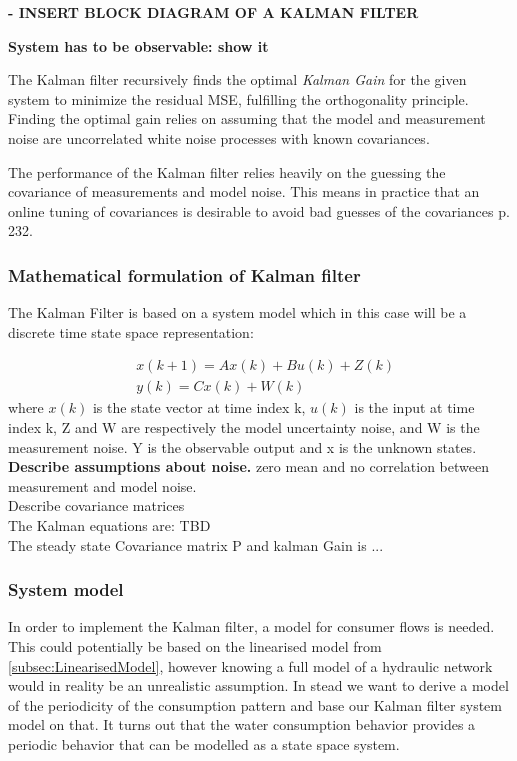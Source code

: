 \textbf{- INSERT BLOCK DIAGRAM OF A KALMAN FILTER }

\textbf{System has to be observable: show it}

The Kalman filter recursively finds the optimal \textit{Kalman Gain} for the given system to minimize the residual MSE, fulfilling the orthogonality principle. Finding the optimal gain relies on assuming that the model and measurement noise are uncorrelated white noise processes with known covariances. 

The performance of the Kalman filter relies heavily on the guessing the covariance of measurements and model noise. This means in practice that an online tuning of covariances is desirable to avoid bad guesses of the covariances \cite{Doraiswami2014} p. 232.


\subsubsection{Mathematical formulation of Kalman filter}
The Kalman Filter is based on a system model which in this case will be a discrete time state space representation: 

\begin{align}
	&x(k+1) = Ax(k) + Bu(k) + Z(k)  \label{eq:KalmanSystemEquations} \\
	&y(k) = Cx(k)+W(k)
\end{align}
where $x(k)$ is the state vector at time index k, $u(k)$ is the input at time index k, 
Z and W are respectively the model uncertainty noise, and W is the measurement noise. Y is the observable output and x is the unknown states. \\
\textbf{Describe assumptions about noise. } zero mean and no correlation between measurement and model noise.\\

Describe covariance matrices\\


The Kalman equations are: TBD \\

The steady state Covariance matrix P and kalman Gain is ...




\subsubsection{System model}
In order to implement the Kalman filter, a model for consumer flows is needed. This could potentially be based on the linearised model from \cref{subsec:LinearisedModel}, however knowing a full model of a hydraulic network would in reality be an unrealistic assumption. In stead we want to derive a model of the periodicity of the consumption pattern and base our Kalman filter system model on that. It turns out that the water consumption behavior provides a periodic behavior that can be modelled as a state space system. 

